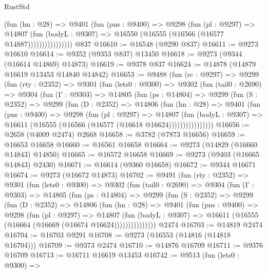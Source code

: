 \begin{lexlean}{RustStd}
\begin{coremodule}
{\begin{coremodule}
{{{{{{{{{{{{{{{{{{{{{{{{{{{{{{{{{{{{{{{{{{{{{{{{{{{{{{{                      (fun (hn : @28) =>
                      @9401
                        (fun (pns : @9400) =>
                        @9298
                          (fun (pl : @9297) =>
                          @14807
                            (fun (bodyL : @9307) =>
                            @16550 (@16555 (@16566 (@16577 @14887))))))))))))))))
    @837
@16610 := @16548 (@9290 @837)
@16611 := @9273 @16610
@16614 := @9352 (@9353 @837) @13450
@16618 := @9273 (@9344 (@16614 @14869) @14873)
@16619 := @9378 @837
@16624 := @14878 (@14879 @16619 @13453 @14840 @14842)
@16653 := @9488
    (fun (rc : @9297) =>
    @9299
      (fun (rty : @2352) =>
      @9301
        (fun (lets0 : @9300) =>
        @9302
          (fun (tail0 : @2690) =>
          @9304
            (fun (Γ : @9303) =>
            @14805
              (fun (ps : @14804) =>
              @9299
                (fun (S : @2352) =>
                @9299
                  (fun (D : @2352) =>
                  @14806
                    (fun (hn : @28) =>
                    @9401
                      (fun (pns : @9400) =>
                      @9298
                        (fun (pl : @9297) =>
                        @14807
                          (fun (bodyL : @9307) =>
                          @16611 (@16555 (@16566 (@16577 (@16618 @16624))))))))))))))))
@16656 := @2658 (@4009 @2474) @2668
@16658 := @3782 (@7873 @16656)
@16659 := @16653 @16658
@16660 := @16561 @16658
@16664 := @9273 (@14829 (@16660 @14843) @14850)
@16665 := @16572 @16658
@16669 := @9273 (@9403 (@16665 @14843) @2430)
@16671 := @16614 (@9360 @16658)
@16672 := @9344 @16671
@16674 := @9273 (@16672 @14873)
@16702 := @9491
    (fun (rty : @2352) =>
    @9301
      (fun (lets0 : @9300) =>
      @9302
        (fun (tail0 : @2690) =>
        @9304
          (fun (Γ : @9303) =>
          @14805
            (fun (ps : @14804) =>
            @9299
              (fun (S : @2352) =>
              @9299
                (fun (D : @2352) =>
                @14806
                  (fun (hn : @28) =>
                  @9401
                    (fun (pns : @9400) =>
                    @9298
                      (fun (pl : @9297) =>
                      @14807
                        (fun (bodyL : @9307) =>
                        @16611 (@16555 (@16664 (@16669 (@16674 @16624)))))))))))))))
    @2474
@16703 := @14819 @2474
@16704 := @16703 @9291
@16708 := @9273 (@16553 (@14816 (@14818 @16704)))
@16709 := @9373 @2474
@16710 := @14876 @16709
@16711 := @9376 @16709
@16713 := @16711 @16619 @13453
@16742 := @9513
    (fun (lets0 : @9300) =>
}}}}}}}}}}}}}}}}}}}}}}}}}}}}}}}}}}}}}}}}}}}}}}}}}}}}}}}
\end{coremodule}}
\end{coremodule}
\end{lexlean}
